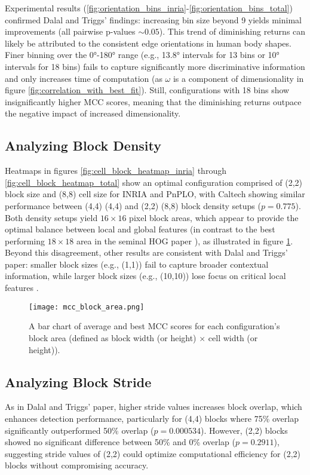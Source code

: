 Experimental results (\ref{fig:orientation_bins_inria}-\ref{fig:orientation_bins_total}) confirmed Dalal and Triggs' findings: increasing bin size beyond 9 yields minimal improvements \cite{dalal_2005_histograms} (all pairwise p-values $\sim 0.05$). This trend of diminishing returns can likely be attributed to the consistent edge orientations in human body shapes. Finer binning over the 0°-180° range (e.g., 13.8° intervals for 13 bins or 10° intervals for 18 bins) fails to capture significantly more discriminative information and only increases time of computation (as $\omega$ is a component of dimensionality in figure \ref{fig:correlation_with_best_fit}). Still, configurations with 18 bins show insignificantly higher MCC scores, meaning that the diminishing returns outpace the negative impact of increased dimensionality.

\subsection{Analyzing Block Density}

Heatmaps in figures \ref{fig:cell_block_heatmap_inria} through \ref{fig:cell_block_heatmap_total} show an optimal configuration comprised of (2,2) block size and (8,8) cell size for INRIA and PnPLO, with Caltech showing similar performance between (4,4) (4,4) and (2,2) (8,8) block density setups ($p=0.775$). Both density setups yield $16\times16$ pixel block areas, which appear to provide the optimal balance between local and global features (in contrast to the best performing $18\times18$ area in the seminal HOG paper \cite{dalal_2005_histograms}), as illustrated in figure \ref{fig:block_area}. Beyond this disagreement, other results are consistent with Dalal and Triggs' paper: smaller block sizes (e.g., (1,1)) fail to capture broader contextual information, while larger block sizes (e.g., (10,10)) lose focus on critical local features \cite{dalal_2005_histograms}.

\begin{figure}
    \texttt{[image: mcc\_block\_area.png]}
    \caption{
        A bar chart of average and best MCC scores for each configuration's block area (defined as block width (or height) $\times$ cell width (or height)). 
    }
    \label{fig:block_area}
\end{figure}

\subsection{Analyzing Block Stride}

As in Dalal and Triggs' paper, higher stride values increases block overlap, which enhances detection performance, particularly for (4,4) blocks where 75\% overlap significantly outperformed 50\% overlap ($p=0.000534$). However, (2,2) blocks showed no significant difference between 50\% and 0\% overlap ($p=0.2911$), suggesting stride values of (2,2) could optimize computational efficiency for (2,2) blocks without compromising accuracy.